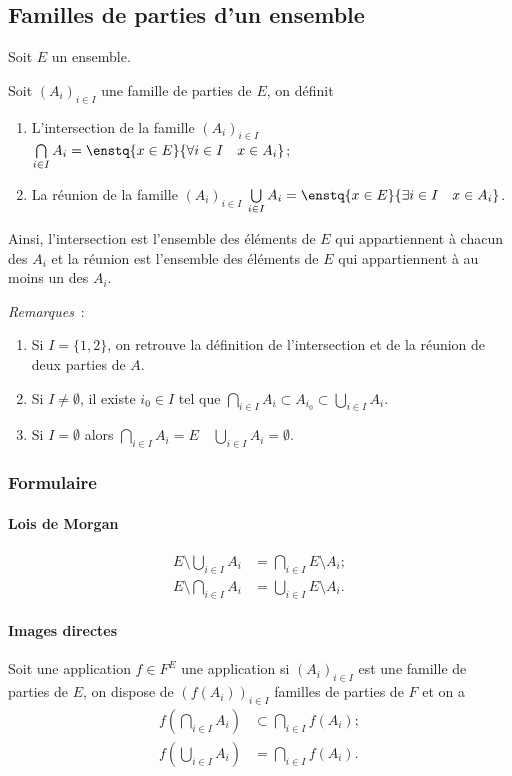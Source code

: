 \subsection{Familles de parties d'un ensemble}
\label{chap3-subsec:familledeparties}
Soit $E$ un ensemble.
\begin{defdef}
  Soit $(A_i)_{i \in I}$ une famille de parties de $E$, on définit
  \begin{enumerate}
  \item L'intersection de la famille $(A_i)_{i \in I}$  $\bigcap\limits_{i \in I} A_i = \enstq{x \in E}{\forall i \in I \quad x \in A_i}$;
  \item La réunion de la famille $(A_i)_{i \in I}$  $\bigcup\limits_{i \in I} A_i = \enstq{x \in E}{\exists i \in I \quad x \in A_i}$.
  \end{enumerate}
\end{defdef}
Ainsi, l'intersection est l'ensemble des éléments de $E$ qui appartiennent à chacun des $A_i$ et la réunion est l'ensemble des éléments de $E$ qui appartiennent à au moins un des $A_i$.

\emph{Remarques}~:
\begin{enumerate}
\item Si $I=\{1,2\}$, on retrouve la définition de l'intersection et de la réunion de deux parties de $A$.
\item Si $I \neq \emptyset$, il existe $i_0 \in I$ tel que $\bigcap\limits_{i \in I} A_i \subset A_{i_0} \subset \bigcup\limits_{i \in I} A_i$.
\item Si $I = \emptyset$ alors $\bigcap\limits_{i \in I} A_i =E \quad \bigcup\limits_{i \in I} A_i=\emptyset$.
\end{enumerate}
%
\subsubsection{Formulaire}
\label{chap3-subsubsec:formulaireensemble}
\paragraph{Lois de Morgan}
\label{chap3-par:morgan}
\begin{align}
  E \setminus \bigcup\limits_{i \in I} A_i &= \bigcap\limits_{i \in I} E \setminus A_i;\\
  E \setminus \bigcap\limits_{i \in I} A_i &= \bigcup\limits_{i \in I} E \setminus A_i.
\end{align}
\paragraph{Images directes}
\label{chap3-par:imagedir}
Soit une application $f \in F^E$ une application si $(A_i)_{i \in I}$ est une famille de parties de $E$, on dispose de $(f(A_i))_{i \in I}$ familles de parties de $F$ et on a 
\begin{align}
  f \left(\bigcap\limits_{i \in I} A_i\right) &\subset \bigcap\limits_{i \in I} f(A_i);\\
  f \left(\bigcup\limits_{i \in I} A_i\right) &= \bigcap\limits_{i \in I} f(A_i).
\end{align}

